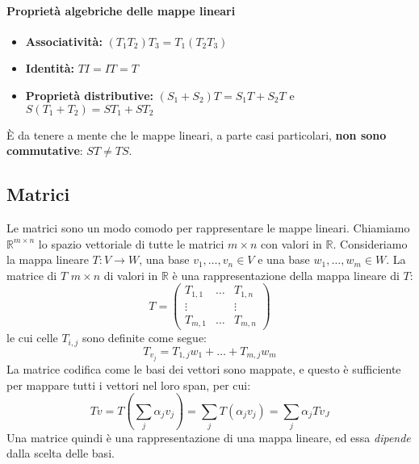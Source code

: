 \documentclass{article}
\begin{document}
            \paragraph{Proprietà algebriche delle mappe lineari}
                \begin{itemize}
                    \item \textbf{Associatività:} $(T_1T_2)T_3 = T_1(T_2T_3)$
                    \item \textbf{Identità:} $TI = IT = T$
                    \item \textbf{Proprietà distributive:} $(S_1+S_2)T = S_1T + S_2T$ e $S(T_1 + T_2) = ST_1+ST_2$
                \end{itemize}
                È da tenere a mente che le mappe lineari, a parte casi particolari, \textbf{non sono commutative}: $ST \neq TS$.
        \subsection{Matrici}
            Le matrici sono un modo comodo per rappresentare le mappe lineari. Chiamiamo $\mathbb{R}^{m \times n}$
            lo spazio vettoriale di tutte le matrici $m \times n$ con valori in $\mathbb{R}$. Consideriamo la mappa lineare $T:V \to W$, una 
            base $v_1, \dots, v_n \in V$ e una base $w_1, \dots, w_m \in W$. 
            La matrice di $T$ $m \times n$ di valori in $\mathbb{R}$ è una rappresentazione della mappa lineare di $T$:
                \[T = \begin{pmatrix}
                T_{1,1} & \dots & T_{1,n}\\
                \vdots & & \vdots \\
                T_{m,1} & \dots & T_{m,n}
                \end{pmatrix}\]
            le cui celle $T_{i,j}$ sono definite come segue:
            \[ T_{v_j} = T_{1,j}w_1 + \dots + T_{m,j}w_m\]
            La matrice codifica come le basi dei vettori sono mappate, e questo è sufficiente per mappare tutti i vettori 
            nel loro span, per cui:
            \[Tv = T(\sum_j \alpha_j v_j) = \sum_j T(\alpha_jv_j) = \sum_j \alpha_jTv_J\]
            Una matrice quindi è una rappresentazione di una mappa lineare, ed essa \emph{dipende} dalla scelta delle basi.
\end{document}
